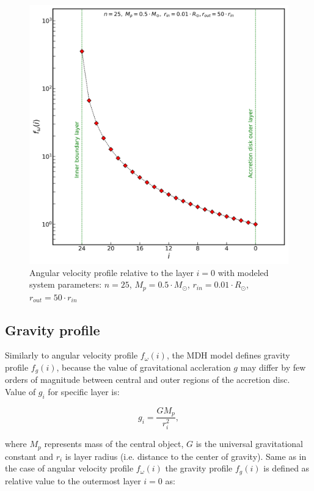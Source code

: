 \begin{figure}[H]
\centering
\includegraphics[width=0.9\columnwidth]{img/profile_omega.png}
\caption{Angular velocity profile relative to the layer $i = 0$ with modeled system parameters: $n=25$, $M_p = 0.5 \cdot M_{\odot}$, $r_{in} = 0.01 \cdot R_{\odot}$, $r_{out} = 50 \cdot r_{in}$}
\label{fig:profile_omega}
\end{figure}

\subsection{Gravity profile}

Similarly to angular velocity profile $f_{\omega}(i)$, the MDH model defines gravity profile $f_g(i)$, because the value of gravitational accleration $g$ may differ by few orders of magnitude between central and outer regions of the accretion disc.  Value of $g_i$ for specific layer is:

\begin{equation} \label{eq:layer_g}
g_{i} = \frac{GM_{p}}{r_{i}^2},
\end{equation}

where $M_p$ represents mass of the central object, $G$ is the universal gravitational constant and $r_i$ is layer radius (i.e. distance to the center of gravity). Same as in the case of angular velocity profile $f_{\omega}(i)$ the gravity profile $f_g(i)$ is defined as relative value to the outermost layer $i = 0$ as:

